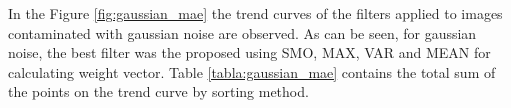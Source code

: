 %		
%
%
\normalsize

In the Figure \ref{fig:gaussian_mae} the trend curves of the filters applied to images contaminated with gaussian noise are observed. As can be seen, for gaussian noise, the best filter was the proposed using SMO, MAX, VAR and MEAN for calculating weight vector. Table \ref{tabla:gaussian_mae}  contains the total sum of the points on the trend curve  by sorting method.

